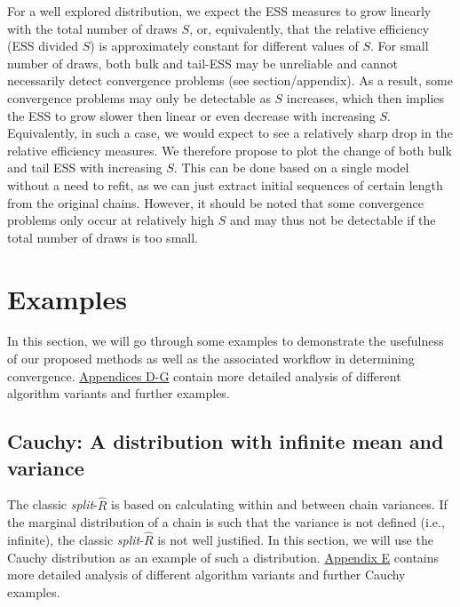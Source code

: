\documentclass[american,]{article}
\begin{document}
For a well explored distribution, we expect the ESS measures to grow
linearly with the total number of draws \(S\), or, equivalently, that
the relative efficiency (ESS divided \(S\)) is approximately constant
for different values of \(S\). For small number of draws, both bulk and
tail-ESS may be unreliable and cannot necessarily detect convergence
problems (see section/appendix). As a result, some convergence problems may only be
detectable as \(S\) increases, which then implies the ESS to grow slower
then linear or even decrease with increasing \(S\). Equivalently, in
such a case, we would expect to see a relatively sharp drop in the
relative efficiency measures. We therefore propose to plot the change of
both bulk and tail ESS with increasing \(S\). This can be done based on
a single model without a need to refit, as we can just extract initial
sequences of certain length from the original chains. However, it should
be noted that some convergence problems only occur at relatively high
\(S\) and may thus not be detectable if the total number of draws is too
small.

\hypertarget{examples}{%
\section{Examples}\label{examples}}

In this section, we will go through some examples to demonstrate the
usefulness of our proposed methods as well as the associated workflow in
determining convergence. \protect\hyperlink{AppendixD}{Appendices D-G}
contain more detailed analysis of different algorithm variants and
further examples.

\hypertarget{cauchy-a-distribution-with-infinite-mean-and-variance}{%
\subsection{Cauchy: A distribution with infinite mean and
variance}\label{cauchy-a-distribution-with-infinite-mean-and-variance}}

The classic \emph{split}-\(\widehat{R}\) is based on calculating within
and between chain variances. If the marginal distribution of a chain is
such that the variance is not defined (i.e., infinite), the classic
\emph{split}-\(\widehat{R}\) is not well justified. In this section, we
will use the Cauchy distribution as an example of such a distribution.
\protect\hyperlink{AppendixE}{Appendix E} contains more detailed
analysis of different algorithm variants and further Cauchy examples.
\end{document}

